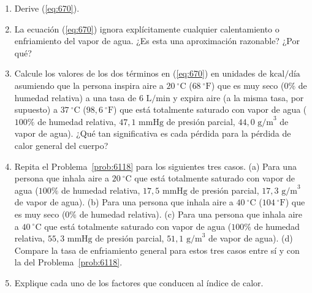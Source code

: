 \documentclass[12pt]{book}
\begin{document}
\begin{enumerate}
\item[6.116] Derive (\ref{eq:670}).

\item[6.117] La ecuación (\ref{eq:670}) ignora explícitamente cualquier calentamiento o enfriamiento del vapor de agua. ¿Es esta una aproximación razonable? ¿Por qué?

\item[6.118] \label{prob:6118} Calcule los valores de los dos términos en (\ref{eq:670}) en unidades de $\text{kcal/día}$ asumiendo que la persona inspira aire a $20\ ^\circ\text{C}$ ($68\ ^\circ\text{F}$) que es muy seco ($0\%$ de humedad relativa) a una tasa de $6\text{ L/min}$ y expira aire (a la misma tasa, por supuesto) a $37\ ^\circ\text{C}$ ($98{,}6\ ^\circ\text{F}$) que está totalmente saturado con vapor de agua ($100\%$ de humedad relativa, $47{,}1\text{ mmHg}$ de presión parcial, $44{,}0\text{ g/m}^3$ de vapor de agua). ¿Qué tan significativa es cada pérdida para la pérdida de calor general del cuerpo?

\item[6.119] Repita el Problema~\ref{prob:6118} para los siguientes tres casos. (a) Para una persona que inhala aire a $20\ ^\circ\text{C}$ que está totalmente saturado con vapor de agua ($100\%$ de humedad relativa, $17{,}5\text{ mmHg}$ de presión parcial, $17{,}3\text{ g/m}^3$ de vapor de agua). (b) Para una persona que inhala aire a $40\ ^\circ\text{C}$ ($104\ ^\circ\text{F}$) que es muy seco ($0\%$ de humedad relativa). (c) Para una persona que inhala aire a $40\ ^\circ\text{C}$ que está totalmente saturado con vapor de agua ($100\%$ de humedad relativa, $55{,}3\text{ mmHg}$ de presión parcial, $51{,}1\text{ g/m}^3$ de vapor de agua). (d) Compare la tasa de enfriamiento general para estos tres casos entre sí y con la del Problema~\ref{prob:6118}.

\item[6.120] Explique cada uno de los factores que conducen al índice de calor.


\end{enumerate}
\end{document}
